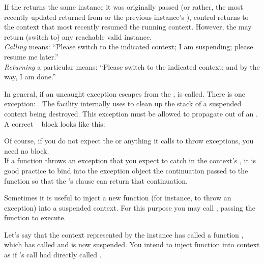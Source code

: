 If the \entryfn returns the same \cont instance it was originally
passed (or rather, the most recently updated \cont returned from \callcc or the
previous instance's \resume), control returns to the context that most
recently resumed the running context. However, the \entryfn may return (switch
to) any reachable valid \cont instance.\\

\emph{Calling} \contresume means: ``Please switch to the indicated context; I
am suspending; please resume me later.''\\

\emph{Returning} a particular \cont means: ``Please switch to the indicated
context; and by the way, I am done.''


\label{subsec:exceptions}

In general, if an uncaught exception escapes from the \entryfn,
 is called. There is one exception: \unwindex. The \callcc
facility internally uses \unwindex to clean up the stack of a suspended context
being destroyed. This exception must be allowed to propagate out of an \entryfn.\\

A correct \entryfn\  block looks like this:

Of course, if you do not expect the \entryfn or anything it calls to throw
exceptions, you need no  block.\\

If a \resumewith function throws an exception that you expect to catch in the
context's \entryfn, it is good practice to bind into the exception object the
continuation passed to the \resumewith function so that
the \entryfn's  clause can return that continuation.


\label{subsec:resumewith}

Sometimes it is useful to inject a new function (for instance, to throw an
exception) into a suspended context. For this purpose you may call
, passing the function  to execute.

Let's say that the context represented by the \cont instance  has
called a function , which has called \contresume and is now
suspended. You intend to inject function  into context  as
if 's \suspend call had directly called .\\


